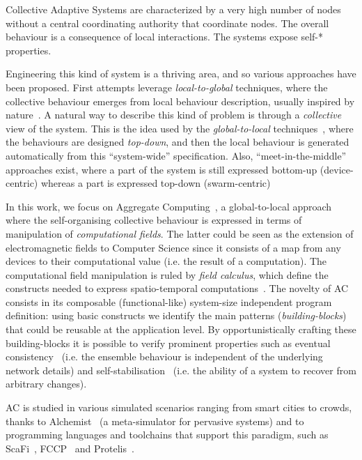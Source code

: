 \documentclass[conference]{IEEEtran}
\begin{document}
Collective Adaptive Systems are characterized by a very high number of nodes without a central coordinating authority that coordinate nodes. The overall behaviour is a consequence of local interactions. The systems expose self-* properties.
 
Engineering this kind of system is a thriving area, and so various approaches have been proposed.
 First attempts leverage \textit{local-to-global} techniques, where the collective behaviour emerges from local behaviour description, 
 usually inspired by nature~\cite{DBLP:journals/swarm/BrambillaFBD13}. 
%
 A natural way to describe this kind of problem is through a \textit{collective} view of the system.
 This is the idea used by the \textit{global-to-local} techniques~\cite{DBLP:journals/jlap/ViroliBDACP19,DBLP:journals/scp/AlrahmanNL20, DBLP:conf/cbse/BuresGHKKP13}, 
 where the behaviours are designed \textit{top-down}, and then the local behaviour is generated automatically from this ``system-wide'' specification. 
% 
Also, ``meet-in-the-middle''~\cite{DBLP:journals/computer/PinciroliB16} approaches exist, where
 a part of the system is still expressed bottom-up (device-centric) whereas a part is expressed top-down (swarm-centric)

In this work, we focus on Aggregate Computing~\cite{DBLP:journals/computer/BealPV15}, a global-to-local approach where
 the self-organising collective behaviour is expressed in terms of manipulation of \textit{computational fields}.
The latter could be seen as the extension of electromagnetic fields to Computer Science since it consists of a 
 map from any devices to their computational value (i.e. the result of a computation).
The computational field manipulation is ruled by \textit{field calculus}, which define the constructs needed 
 to express spatio-temporal computations~\cite{DBLP:conf/coordination/AudritoBDV18}.
The novelty of AC consists in its composable (functional-like) system-size independent program definition: 
using basic constructs we identify the main patterns (\textit{building-blocks}) that could be reusable at the application level.
By opportunistically crafting these building-blocks it is possible to verify prominent properties such as eventual consistency~\cite{DBLP:journals/taas/BealVPD17} 
 (i.e. the ensemble behaviour is independent of the underlying network details)
 and self-stabilisation~\cite{DBLP:journals/tomacs/ViroliABDP18} (i.e. the ability of a system to recover from arbitrary changes).

AC is studied in various simulated scenarios ranging from smart cities to crowds, 
 thanks to Alchemist~\cite{DBLP:journals/jos/PianiniMV13} (a meta-simulator for pervasive systems) and to programming languages and toolchains that support 
 this paradigm, such as ScaFi~\cite{DBLP:conf/ecoop/CasadeiV16}, FCCP~\cite{DBLP:conf/acsos/Audrito20} and Protelis~\cite{PianiniSAC2015}.
\end{document}
